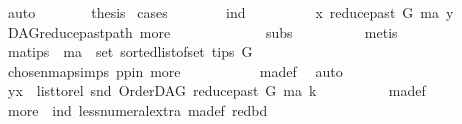 \begin{isabellebody}
\ auto\isanewline
\ \ \ \ \isamarkupfalse%
\ \isamarkupfalse%
\ {\isacharquery}{\kern0pt}thesis\ \isamarkupfalse%
{\isacharparenleft}{\kern0pt}cases{\isacharparenright}{\kern0pt}\isanewline
\ \ \ \ \ \ \isamarkupfalse%
\ ind\isanewline
\ \ \ \ \ \ \isamarkupfalse%
\ \isamarkupfalse%
\ {\isachardoublequoteopen}x\ {\isasymrightarrow}\isactrlsup {\isacharplus}{\kern0pt}\isactrlbsub reduce{\isacharunderscore}{\kern0pt}past\ G\ ma\isactrlesub \ y{\isachardoublequoteclose}\ \isamarkupfalse%
\ DAG{\isachardot}{\kern0pt}reduce{\isacharunderscore}{\kern0pt}past{\isacharunderscore}{\kern0pt}path{}\ more\ \ \isanewline
\ \ \ \ \ \ \ \ \ \ {}\ subs\isanewline
\ \ \ \ \ \ \ \ \isamarkupfalse%
\ {\isacharparenleft}{\kern0pt}metis{\isacharparenright}{\kern0pt}\ \isanewline
\ \ \ \ \ \ \isamarkupfalse%
\ \isamarkupfalse%
\ ma{\isacharunderscore}{\kern0pt}tips{\isacharcolon}{\kern0pt}\ {\isachardoublequoteopen}\ ma\ {\isasymin}\ set\ {\isacharparenleft}{\kern0pt}sorted{\isacharunderscore}{\kern0pt}list{\isacharunderscore}{\kern0pt}of{\isacharunderscore}{\kern0pt}set\ {\isacharparenleft}{\kern0pt}tips\ G{\isacharparenright}{\kern0pt}{\isacharparenright}{\kern0pt}{\isachardoublequoteclose}\ \isanewline
\ \ \ \ \ \ \ \ \isamarkupfalse%
\ chosen{\isacharunderscore}{\kern0pt}map{\isacharunderscore}{\kern0pt}simps{\isacharparenleft}{\kern0pt}{}{\isacharparenright}{\kern0pt}\ pp{\isacharunderscore}{\kern0pt}in\ more{\isacharparenleft}{\kern0pt}{}{\isacharparenright}{\kern0pt}\ \isanewline
\ \ \ \ \ \ \ \ \isamarkupfalse%
\ ma{\isacharunderscore}{\kern0pt}def\ \isamarkupfalse%
\ auto\isanewline
\ \ \ \ \ \ \isamarkupfalse%
\ \isamarkupfalse%
\ {\isachardoublequoteopen}{\isacharparenleft}{\kern0pt}y{\isacharcomma}{\kern0pt}x{\isacharparenright}{\kern0pt}\ {\isasymin}\ list{\isacharunderscore}{\kern0pt}to{\isacharunderscore}{\kern0pt}rel\ {\isacharparenleft}{\kern0pt}snd\ {\isacharparenleft}{\kern0pt}OrderDAG\ {\isacharparenleft}{\kern0pt}reduce{\isacharunderscore}{\kern0pt}past\ G\ ma{\isacharparenright}{\kern0pt}\ k{\isacharparenright}{\kern0pt}{\isacharparenright}{\kern0pt}{\isachardoublequoteclose}\isanewline
\ \ \ \ \ \ \ \ \isamarkupfalse%
\ ma{\isacharunderscore}{\kern0pt}def\isanewline
\ \ \ \ \ \ \ \ \isamarkupfalse%
\ more\ {}\ ind\ less{\isacharunderscore}{\kern0pt}numeral{\isacharunderscore}{\kern0pt}extra{\isacharparenleft}{\kern0pt}{}{\isacharparenright}{\kern0pt}\ ma{\isacharunderscore}{\kern0pt}def\ red{\isacharunderscore}{\kern0pt}bd\isanewline

\end{isabellebody}

